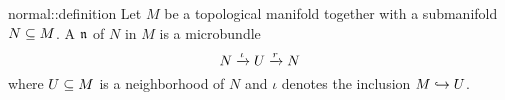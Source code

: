 \begin{mydefinition}{normal::definition}{}
    Let $M$ be a topological manifold together with a submanifold $N \subseteq{} M$.
    A  $\mathfrak{n}$ of $N$ in $M$ is a microbundle
    \[ N \xrightarrow{\iota} U \xrightarrow{r} N{} \]
    where $U \subseteq{} M$ is a neighborhood of $N$ and $\iota$ denotes the inclusion $M \hookrightarrow{} U$.
\end{mydefinition}